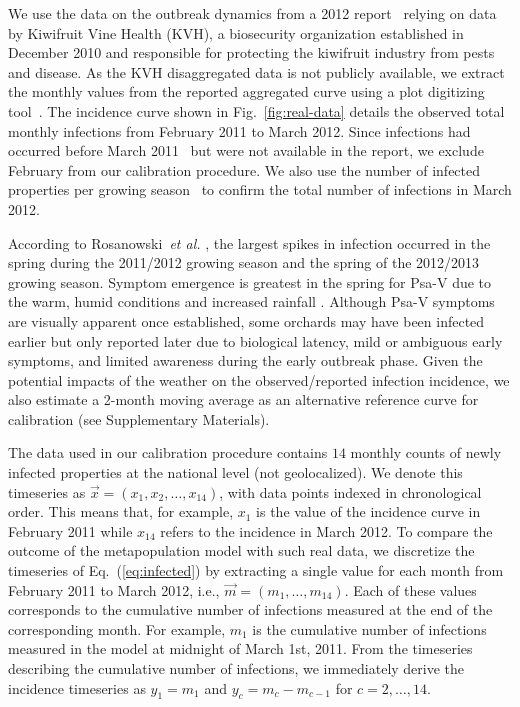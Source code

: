 \documentclass[aps,physrev,reprint,superscriptaddress]{revtex4-1}
\begin{document}

We use the data on the outbreak dynamics from a 2012 report~\cite{greer2012costs} relying on data by Kiwifruit Vine Health (KVH), a biosecurity organization established in December 2010\cite{birnie2014lessons} and responsible for protecting the kiwifruit industry from pests and disease. As the KVH disaggregated data is not publicly available, we extract the monthly values from the reported aggregated curve using a plot digitizing tool~\cite{PlotDigitizer}. The incidence curve shown in Fig.~\ref{fig:real-data} details the observed total monthly infections from 
February 2011 to March 2012. Since infections had occurred before March 2011~\cite{rosanowski2013quantification} but were not available in the report, 
we exclude February from our calibration procedure. We also use the number of infected properties per growing season~\cite{rosanowski2013quantification} to confirm the total number of infections in March 2012. 

 


According to Rosanowski~\textit{et al.} \cite{rosanowski2013quantification}, the largest spikes in infection occurred in the spring during the 2011/2012 growing season and the spring of the 2012/2013 growing season. Symptom emergence is greatest in the spring for Psa-V due to the warm, humid conditions and increased rainfall \cite{froud2015review}. Although Psa-V symptoms are visually apparent once established, some orchards may have been infected earlier but only reported later due to biological latency, mild or ambiguous early symptoms, and limited awareness during the early outbreak phase. Given the potential impacts of the weather on the observed/reported infection incidence, we also estimate a 2-month moving average as an alternative reference curve for calibration (see Supplementary Materials). 


The data used in our calibration procedure contains $14$ monthly counts of newly infected properties at the national level (not geolocalized).  We denote this timeseries as $\vec{x} = (x_1, x_2, \ldots, x_{14})$, with data points indexed in chronological order. This means that, for example, $x_1$ is the value of the incidence curve in February 2011 while $x_{14}$ refers to the incidence in March 2012. To compare the outcome of the metapopulation model with such real data, we discretize the timeseries of Eq.~(\ref{eq:infected}) by extracting a single value for each month from February 2011 to March 2012, i.e.,  $\vec{m} = (m_1, \ldots, m_{14})$. Each of these values corresponds to the cumulative number of infections measured at the end of the corresponding month. For example, $m_1$ is the cumulative number of infections measured in the model at midnight of March 1st,  2011. From the timeseries describing the cumulative number of infections, we immediately derive the incidence timeseries as $y_1 = m_1$ and $y_c = m_c - m_{c-1}$ for $c = 2, \ldots, 14$. 
\end{document}
